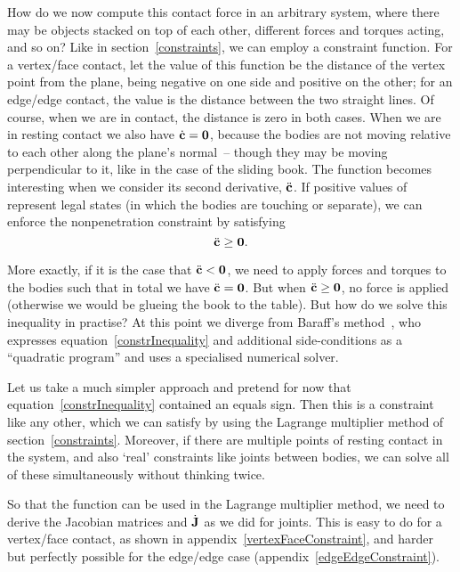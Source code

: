 How do we now compute this contact force in an arbitrary system, where there may be objects stacked
on top of each other, different forces and torques acting, and so on? Like in
section~\ref{constraints}, we can employ a constraint function. For a vertex/face contact, let the
value of this function  be the distance of the vertex point from the plane, being negative on
one side and positive on the other; for an edge/edge contact, the value is the distance between the
two straight lines. Of course, when we are in contact, the distance is zero in both cases. When we
are in resting contact we also have $\dot{\ve{c}} = \ve{0}$, because the bodies are not moving
relative to each other along the plane's normal~-- though they may be moving perpendicular to it,
like in the case of the sliding book. The function becomes interesting when we consider its second
derivative, $\ddot{\ve{c}}$. If positive values of  represent legal states (in which the
bodies are touching or separate), we can enforce the nonpenetration constraint by satisfying
\begin{equation} \label{constrInequality}
\ddot{\ve{c}} \ge \ve{0}.
\end{equation}

More exactly, if it is the case that $\ddot{\ve{c}} < \ve{0}$, we need to apply forces and torques
to the bodies such that in total we have $\ddot{\ve{c}} = \ve{0}$. But when
$\ddot{\ve{c}} \ge \ve{0}$, no force is applied (otherwise we would be glueing the book to the
table). But how do we solve this inequality in practise? At this point we diverge from Baraff's
method~\cite{BaraffWitkin:97}, who expresses equation~\ref{constrInequality} and additional
side-conditions as a ``quadratic program'' and uses a specialised numerical solver.

Let us take a much simpler approach and pretend for now that equation~\ref{constrInequality}
contained an equals sign. Then this is a constraint like any other, which we can satisfy by using
the Lagrange multiplier method of section~\ref{constraints}. Moreover, if there are multiple
points of resting contact in the system, and also `real' constraints like joints between bodies,
we can solve all of these simultaneously without thinking twice.

So that the function  can be used in the Lagrange multiplier method, we need to derive the
Jacobian matrices  and $\dot{\m{J}}$ as we did for joints. This is easy to do for a
vertex/face contact, as shown in appendix~\ref{vertexFaceConstraint}, and harder but perfectly
possible for the edge/edge case (appendix~\ref{edgeEdgeConstraint}).

